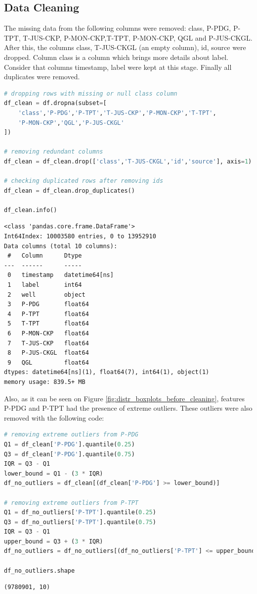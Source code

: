 \documentclass{article}
\begin{document}
\subsection{Data Cleaning}

The missing data from the following columns were removed: class, P-PDG, P-TPT, T-JUS-CKP, P-MON-CKP,T-TPT, P-MON-CKP, QGL and P-JUS-CKGL. After this, the columns class, T-JUS-CKGL (an empty column), id, source were dropped. Column class is a column which brings more details about label. Consider that columns timestamp, label were kept at this stage. Finally all duplicates were removed. 

\begin{lstlisting}[language=Python]
# dropping rows with missing or null class column
df_clean = df.dropna(subset=[
    'class','P-PDG','P-TPT','T-JUS-CKP','P-MON-CKP','T-TPT',
    'P-MON-CKP','QGL','P-JUS-CKGL'
])

# removing redundant columns
df_clean = df_clean.drop(['class','T-JUS-CKGL','id','source'], axis=1)

# checking duplicated rows after removing ids
df_clean = df_clean.drop_duplicates()

df_clean.info()
\end{lstlisting}

\begin{verbatim}
<class 'pandas.core.frame.DataFrame'>
Int64Index: 10003580 entries, 0 to 13952910
Data columns (total 10 columns):
 #   Column      Dtype         
---  ------      -----         
 0   timestamp   datetime64[ns]
 1   label       int64         
 2   well        object        
 3   P-PDG       float64       
 4   P-TPT       float64       
 5   T-TPT       float64       
 6   P-MON-CKP   float64       
 7   T-JUS-CKP   float64       
 8   P-JUS-CKGL  float64       
 9   QGL         float64       
dtypes: datetime64[ns](1), float64(7), int64(1), object(1)
memory usage: 839.5+ MB
\end{verbatim}

Also, as it can be seen on Figure \ref{fig:distr_boxplots_before_cleaning}, features P-PDG and P-TPT had the presence of extreme outliers. These outliers were also removed with the following code:

\begin{lstlisting}[language=Python]
# removing extreme outliers from P-PDG 
Q1 = df_clean['P-PDG'].quantile(0.25)
Q3 = df_clean['P-PDG'].quantile(0.75)
IQR = Q3 - Q1
lower_bound = Q1 - (3 * IQR)
df_no_outliers = df_clean[(df_clean['P-PDG'] >= lower_bound)]

# removing extreme outliers from P-TPT
Q1 = df_no_outliers['P-TPT'].quantile(0.25)
Q3 = df_no_outliers['P-TPT'].quantile(0.75)
IQR = Q3 - Q1
upper_bound = Q3 + (3 * IQR)
df_no_outliers = df_no_outliers[(df_no_outliers['P-TPT'] <= upper_bound)]

df_no_outliers.shape
\end{lstlisting}
\begin{verbatim}
(9780901, 10)
\end{verbatim}
\end{document}
